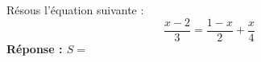 \medskip

Résous l'équation suivante : 
\[\dfrac{x-2}{3}=\dfrac{1-x}{2}+\dfrac{x}{4}\]
\vspace{4cm}
{\bfseries Réponse : $S=$}